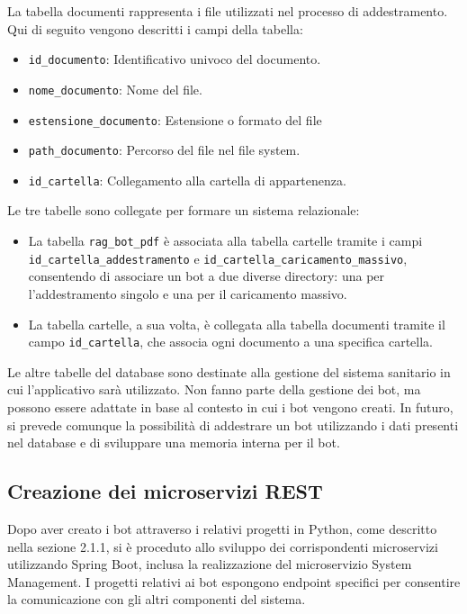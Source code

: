 \documentclass[a4paper,twoside,12pt]{toptesi}
\begin{document}
La tabella documenti rappresenta i file utilizzati nel processo di addestramento. Qui di seguito vengono descritti i campi della tabella:
\begin{itemize}
\item \textnormal{\lstinline|id_documento|}: Identificativo univoco del documento.
\item \textnormal{\lstinline|nome_documento|}: Nome del file.
\item \textnormal{\lstinline|estensione_documento|}: Estensione o formato del file
\item \textnormal{\lstinline|path_documento|}: Percorso del file nel file system.
\item \textnormal{\lstinline|id_cartella|}: Collegamento alla cartella di appartenenza.
\end{itemize}

Le tre tabelle sono collegate per formare un sistema relazionale:
\begin{itemize}
\raggedright
\item La tabella \textnormal{\lstinline|rag_bot_pdf|} è associata alla tabella cartelle tramite i campi \textnormal{\lstinline|id_cartella_addestramento|} e \textnormal{\lstinline|id_cartella_caricamento_massivo|}, consentendo di associare un bot a due diverse directory: una per l'addestramento singolo e una per il caricamento massivo.
\item La tabella cartelle, a sua volta, è collegata alla tabella documenti tramite il campo \textnormal{\lstinline|id_cartella|}, che associa ogni documento a una specifica cartella.
\end{itemize}

Le altre tabelle del database sono destinate alla gestione del sistema sanitario in cui l'applicativo sarà utilizzato. Non fanno parte della gestione dei bot, ma possono essere adattate in base al contesto in cui i bot vengono creati. In futuro, si prevede comunque la possibilità di addestrare un bot utilizzando i dati presenti nel database e di sviluppare una memoria interna per il bot.

\subsection{Creazione dei microservizi REST}

Dopo aver creato i bot attraverso i relativi progetti in Python, come descritto nella sezione 2.1.1, si è proceduto allo sviluppo dei corrispondenti microservizi utilizzando Spring Boot, inclusa la realizzazione del microservizio System Management. I progetti relativi ai bot espongono endpoint specifici per consentire la comunicazione con gli altri componenti del sistema.
\end{document}
